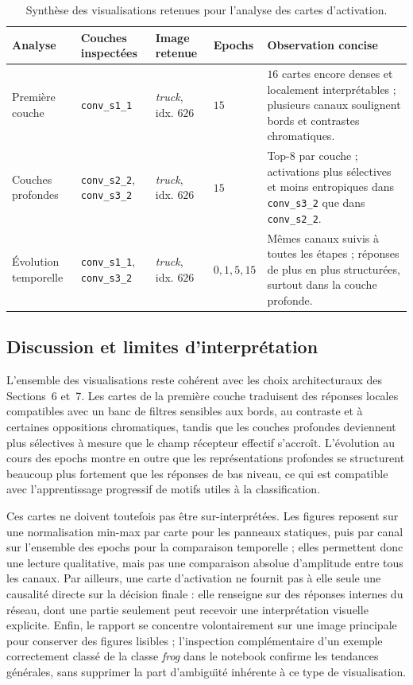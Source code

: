 \begin{table}[htbp]
\centering
\caption{Synth\`ese des visualisations retenues pour l'analyse des cartes d'activation.}
\label{tab:section8_summary}
\footnotesize
\begin{tabular}{|p{2.2cm}|p{2.7cm}|p{2.2cm}|p{1.4cm}|p{6.7cm}|}
\hline
Analyse & Couches inspect\'ees & Image retenue & Epochs & Observation concise \\
\hline
Premi\`ere couche & \texttt{conv\_s1\_1} & \textit{truck}, idx. $626$ & $15$ & $16$ cartes encore denses et localement interpr\'etables ; plusieurs canaux soulignent bords et contrastes chromatiques. \\
\hline
Couches profondes & \texttt{conv\_s2\_2}, \texttt{conv\_s3\_2} & \textit{truck}, idx. $626$ & $15$ & Top-$8$ par couche ; activations plus s\'electives et moins entropiques dans \texttt{conv\_s3\_2} que dans \texttt{conv\_s2\_2}. \\
\hline
\'Evolution temporelle & \texttt{conv\_s1\_1}, \texttt{conv\_s3\_2} & \textit{truck}, idx. $626$ & $0,1,5,15$ & M\^emes canaux suivis \`a toutes les \'etapes ; r\'eponses de plus en plus structur\'ees, surtout dans la couche profonde. \\
\hline
\end{tabular}
\end{table}

\subsection{Discussion et limites d'interpr\'etation}
L'ensemble des visualisations reste coh\'erent avec les choix architecturaux des Sections~6 et~7. Les cartes de la premi\`ere couche traduisent des r\'eponses locales compatibles avec un banc de filtres sensibles aux bords, au contraste et \`a certaines oppositions chromatiques, tandis que les couches profondes deviennent plus s\'electives \`a mesure que le champ r\'ecepteur effectif s'accro\^it. L'\'evolution au cours des epochs montre en outre que les repr\'esentations profondes se structurent beaucoup plus fortement que les r\'eponses de bas niveau, ce qui est compatible avec l'apprentissage progressif de motifs utiles \`a la classification.

Ces cartes ne doivent toutefois pas \^etre sur-interpr\'et\'ees. Les figures reposent sur une normalisation min-max par carte pour les panneaux statiques, puis par canal sur l'ensemble des epochs pour la comparaison temporelle ; elles permettent donc une lecture qualitative, mais pas une comparaison absolue d'amplitude entre tous les canaux. Par ailleurs, une carte d'activation ne fournit pas \`a elle seule une causalit\'e directe sur la d\'ecision finale : elle renseigne sur des r\'eponses internes du r\'eseau, dont une partie seulement peut recevoir une interpr\'etation visuelle explicite. Enfin, le rapport se concentre volontairement sur une image principale pour conserver des figures lisibles ; l'inspection compl\'ementaire d'un exemple correctement class\'e de la classe \textit{frog} dans le notebook confirme les tendances g\'en\'erales, sans supprimer la part d'ambigu\"\i t\'e inh\'erente \`a ce type de visualisation.
